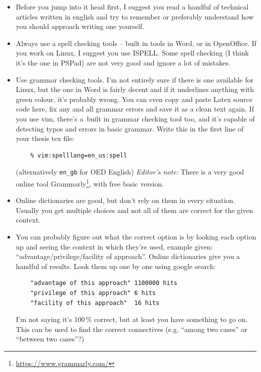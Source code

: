 \begin{itemize}
  \item{Before you jump into it head first, I suggest you read a handful of technical articles written in english and try to remember or preferably understand how you should approach writing one yourself.}
  \item{Always use a spell checking tools -- built in tools in Word, or in OpenOffice. If you work on Linux, I suggest you use ISPELL. Some spell checking (I think it's the one in PSPad) are not very good and ignore a lot of mistakes.}
  \item{Use grammar checking tools. I'm not entirely sure if there is one available for Linux, but the one in Word is fairly decent and if it underlines anything with green colour, it's probably wrong. You can even copy and paste Latex source code here, fix any and all grammar errors and save it as a clean text again. If you use vim, there's a~built in grammar checking tool too, and it's capable of detecting typos and errors in basic grammar. Write this in the first line of your thesis tex file:
  \begin{verbatim}
    % vim:spelllang=en_us:spell
  \end{verbatim}
  (alternatively \texttt{en\_gb} for OED English) \textit{Editor's note:} There is a very good online tool Grammarly\footnote{\url{https://www.grammarly.com/}}, with free basic version.
  }
  \item{Online dictionaries are good, but don't rely on them in every situation. Usually you get multiple choices and not all of them are correct for the given context.}
  \item{\begin{samepage}You can probably figure out what the correct option is by looking each option up and seeing the context in which they're used, example given: ``advantage/privilege/facility of approach''. Online dictionaries give you a handful of results. Look them up one by one using google search:
  \begin{verbatim}
    "advantage of this approach" 1100000 hits
    "privilege of this approach" 6 hits
    "facility of this approach"  16 hits
  \end{verbatim}
  I'm not saying it's 100\,\% correct, but at least you have something to go on. This can be used to find the correct connectives (e.g. ``among two cases'' or ``between two cases''?)\end{samepage}}
\end{itemize}
       

